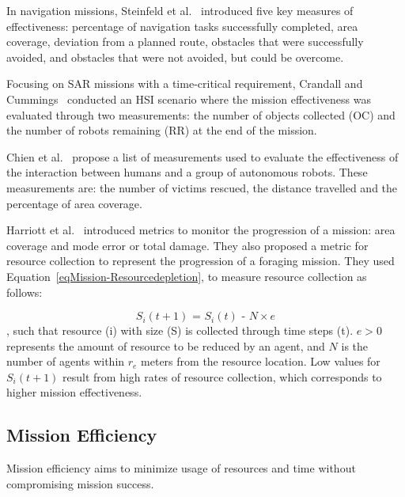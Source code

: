 \documentclass[journal]{IEEEtran}
\begin{document}
In navigation missions, Steinfeld et al.~\cite{steinfeld2006common} introduced five key measures of effectiveness: percentage of navigation tasks successfully completed, area coverage, deviation from a planned route, obstacles that were successfully avoided, and obstacles that were not avoided, but could be overcome.

Focusing on SAR missions with a time-critical requirement, Crandall and Cummings~\cite{crandall2007identifying} conducted an HSI scenario where the mission effectiveness was evaluated through two measurements: the number of objects collected (OC) and the number of robots remaining (RR) at the end of the mission. 

Chien et al.~\cite{chien2012scheduling} propose a list of measurements used to evaluate the effectiveness of the interaction between humans and a group of autonomous robots. These measurements are: the number of victims rescued, the distance travelled and the percentage of area coverage.

Harriott et al.~\cite{harriott2014biologically} %
introduced metrics to monitor the progression of a mission: area coverage and mode error or total damage. They also proposed a metric for resource collection to represent the progression of a foraging mission. They used Equation~\ref{eqMission-Resourcedepletion}, to measure resource collection as follows:

\begin{equation}\label{eqMission-Resourcedepletion}
    \textit{$S_i(t+1)$ = $S_i(t)$ - $N\times e$}
\end{equation}
, such that resource (i) with size (S) is collected through time steps (t).  $e > 0$ represents the amount of resource to be reduced by an agent, and $N$ is the number of agents within $r_e$ meters from the resource location. Low values for $S_i(t+1)$ result from high rates of resource collection, which corresponds to higher mission effectiveness. 

\subsection{Mission Efficiency}
Mission efficiency aims to minimize usage of resources and time without compromising mission success. 
\end{document}

